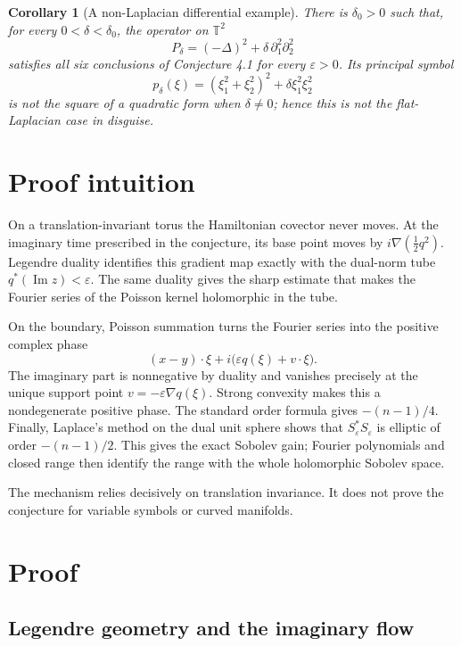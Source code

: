 \documentclass[11pt]{article}
\newtheorem{corollary}{Corollary}
\theoremstyle{remark}
\newcommand{\T}{\mathbb T}
\newcommand{\eps}{\varepsilon}
\begin{document}
\begin{corollary}[A non-Laplacian differential example]\label{cor:quartic}
There is $\delta_0>0$ such that, for every $0<\delta<\delta_0$, the operator on
$\T^2$
\[
P_\delta=(-\Delta)^2+\delta\,\partial_1^2\partial_2^2
\]
satisfies all six conclusions of Conjecture 4.1 for every $\eps>0$.  Its
principal symbol
\[
p_\delta(\xi)=(\xi_1^2+\xi_2^2)^2+\delta\xi_1^2\xi_2^2
\]
is not the square of a quadratic form when $\delta\ne0$; hence this is not the
flat-Laplacian case in disguise.
\end{corollary}

\section{Proof intuition}

On a translation-invariant torus the Hamiltonian covector never moves.  At the
imaginary time prescribed in the conjecture, its base point moves by
$i\nabla(\tfrac12q^2)$.  Legendre duality identifies this gradient map exactly
with the dual-norm tube $q^*(\operatorname{Im}z)<\eps$.  The same duality gives
the sharp estimate that makes the Fourier series of the Poisson kernel
holomorphic in the tube.

On the boundary, Poisson summation turns the Fourier series into the positive
complex phase
\[
(x-y)\cdot\xi+i\bigl(\eps q(\xi)+v\cdot\xi\bigr).
\]
The imaginary part is nonnegative by duality and vanishes precisely at the
unique support point $v=-\eps\nabla q(\xi)$.  Strong convexity makes this a
nondegenerate positive phase.  The standard order formula gives
$-(n-1)/4$.  Finally, Laplace's method on the dual unit sphere shows that
$S_\eps^*S_\eps$ is elliptic of order $-(n-1)/2$.  This gives the exact
Sobolev gain; Fourier polynomials and closed range then identify the range
with the whole holomorphic Sobolev space.

The mechanism relies decisively on translation invariance.  It does not prove
the conjecture for variable symbols or curved manifolds.

\section{Proof}

\subsection{Legendre geometry and the imaginary flow}
\end{document}
